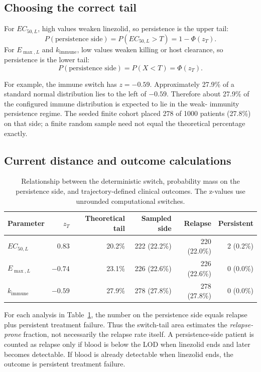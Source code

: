 \documentclass[11pt]{article}
\newcommand{\EC}{EC_{50,L}}
\newcommand{\EM}{E_{\max,L}}
\newcommand{\KI}{k_{\mathrm{immune}}}
\begin{document}
\subsection{Choosing the correct tail}

For $\EC$, high values weaken linezolid, so persistence is the upper tail:
\begin{equation}
P(\text{persistence side})=P(\EC>T)=1-\Phi(z_T).
\end{equation}
For $\EM$ and $\KI$, low values weaken killing or host clearance, so
persistence is the lower tail:
\begin{equation}
P(\text{persistence side})=P(X<T)=\Phi(z_T).
\end{equation}

For example, the immune switch has $z=-0.59$. Approximately 27.9\% of a
standard normal distribution lies to the left of $-0.59$. Therefore about
27.9\% of the configured immune distribution is expected to lie in the weak-
immunity persistence regime. The seeded finite cohort placed 278 of 1000
patients (27.8\%) on that side; a finite random sample need not equal the
theoretical percentage exactly.

\subsection{Current distance and outcome calculations}

\begin{table}[htbp]
\centering
\small
\begin{tabular}{@{}lrrrrr@{}}
\toprule
Parameter & $z_T$ & Theoretical tail & Sampled side & Relapse & Persistent \\
\midrule
$\EC$ & $0.83$ & 20.2\% & 222 (22.2\%) & 220 (22.0\%) & 2 (0.2\%) \\
$\EM$ & $-0.74$ & 23.1\% & 226 (22.6\%) & 226 (22.6\%) & 0 (0.0\%) \\
$\KI$ & $-0.59$ & 27.9\% & 278 (27.8\%) & 278 (27.8\%) & 0 (0.0\%) \\
\bottomrule
\end{tabular}
\caption{Relationship between the deterministic switch, probability mass on
the persistence side, and trajectory-defined clinical outcomes. The z-values
use unrounded computational switches.}
\label{tab:z-outcomes}
\end{table}

For each analysis in Table~\ref{tab:z-outcomes}, the number on the persistence
side equals relapse plus persistent treatment failure. Thus the switch-tail
area estimates the \emph{relapse-prone} fraction, not necessarily the relapse
rate itself. A persistence-side patient is counted as relapse only if blood is
below the LOD when linezolid ends and later becomes detectable. If blood is
already detectable when linezolid ends, the outcome is persistent treatment
failure.
\end{document}
